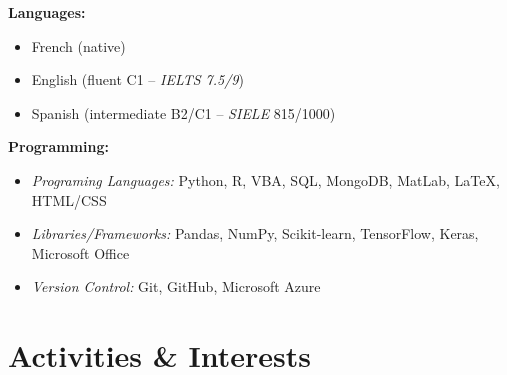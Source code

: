 \documentclass[a4paper,9pt]{extarticle}
\begin{document}
\noindent
\begin{minipage}[t]{0.45\textwidth} %
    \textbf{Languages:}
    \begin{itemize}
        \item French (native)
        \item English (fluent C1 -- \textit{IELTS 7.5/9})
        \item Spanish (intermediate B2/C1 -- \textit{SIELE} 815/1000)
    \end{itemize}
\end{minipage}%
\hfill %
\begin{minipage}[t]{0.45\textwidth} %
    \textbf{Programming:}
    \begin{itemize}
        \item \textit{Programing Languages:} Python, R, VBA, SQL, MongoDB, MatLab, LaTeX, HTML/CSS
        \item \textit{Libraries/Frameworks:} Pandas, NumPy, Scikit-learn, TensorFlow, Keras, Microsoft Office
        \item \textit{Version Control:} Git, GitHub, Microsoft Azure
    \end{itemize}
\end{minipage}

\vspace{6pt}

\section*{\faHeart \hspace{0.1em} Activities \& Interests}
\end{document}

